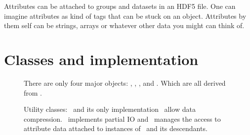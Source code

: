 Attributes can be attached to groups and datasets in an HDF5 file. One  can
imagine attributes as kind of tags that can be stuck on an object. 
Attributes by them self can be strings, arrays or whatever other data you might 
can think of. 


\section{Classes and implementation}\label{section:classes_implementation}

\begin{figure}[tb]
\centering
\begin{minipage}[t]{0.4\linewidth}
\centering
{}
\caption{{\small\label{fig:class_inheritance}
There are only four major objects: \nxobject, \nxfield, \nxgroup, and 
\nxfile. Which are all derived from \nxobject. 
}}
\end{minipage}
\hfill
\begin{minipage}[t]{0.59\linewidth}
\centering
{}
\caption{{\small\label{fig:helper_classes} 
Utility classes: \nxfilter\ and its only implementation \nxdeflate\ allow data
compression. \nxselection\ implements partial IO and \nxattribute\ manages the
access to attribute data attached to instances of \nxobject\ and its
descendants.
}}
\end{minipage}
\end{figure}
